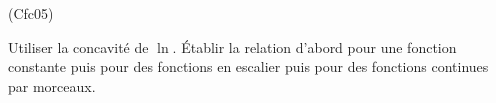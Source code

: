 \begin{tiny}(Cfc05)\end{tiny} Utiliser la concavité de $\ln$. \'Etablir la relation d'abord pour une fonction constante puis pour des fonctions en escalier puis pour des fonctions continues par morceaux.